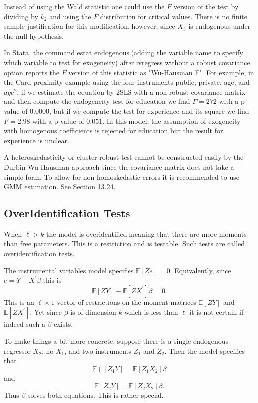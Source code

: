 \documentclass[10pt]{article}
\begin{document}
Instead of using the Wald statistic one could use the $F$ version of the test by dividing by $k_{2}$ and using the $F$ distribution for critical values. There is no finite sample justification for this modification, however, since $X_{3}$ is endogenous under the null hypothesis.

In Stata, the command estat endogenous (adding the variable name to specify which variable to test for exogeneity) after ivregress without a robust covariance option reports the $F$ version of this statistic as "Wu-Hausman F". For example, in the Card proximity example using the four instruments public, private, age, and $a g e^{2}$, if we estimate the equation by 2SLS with a non-robust covariance matrix and then compute the endogeneity test for education we find $F=272$ with a p-value of $0.0000$, but if we compute the test for experience and its square we find $F=2.98$ with a p-value of $0.051$. In this model, the assumption of exogeneity with homogenous coefficients is rejected for education but the result for experience is unclear.

A heteroskedasticity or cluster-robust test cannot be constructed easily by the Durbin-Wu-Hausman approach since the covariance matrix does not take a simple form. To allow for non-homoskedastic errors it is recommended to use GMM estimation. See Section 13.24.

\subsection{OverIdentification Tests}
When $\ell>k$ the model is overidentified meaning that there are more moments than free parameters. This is a restriction and is testable. Such tests are called overidentification tests.

The instrumental variables model specifies $\mathbb{E}[Z e]=0$. Equivalently, since $e=Y-X^{\prime} \beta$ this is
$$
\mathbb{E}[Z Y]-\mathbb{E}\left[Z X^{\prime}\right] \beta=0 .
$$
This is an $\ell \times 1$ vector of restrictions on the moment matrices $\mathbb{E}[Z Y]$ and $\mathbb{E}\left[Z X^{\prime}\right]$. Yet since $\beta$ is of dimension $k$ which is less than $\ell$ it is not certain if indeed such a $\beta$ exists.

To make things a bit more concrete, suppose there is a single endogenous regressor $X_{2}$, no $X_{1}$, and two instruments $Z_{1}$ and $Z_{2}$. Then the model specifies that
$$
\mathbb{E}\left(\left[Z_{1} Y\right]=\mathbb{E}\left[Z_{1} X_{2}\right] \beta\right.
$$
and
$$
\mathbb{E}\left[Z_{2} Y\right]=\mathbb{E}\left[Z_{2} X_{2}\right] \beta .
$$
Thus $\beta$ solves both equations. This is rather special.
\end{document}
